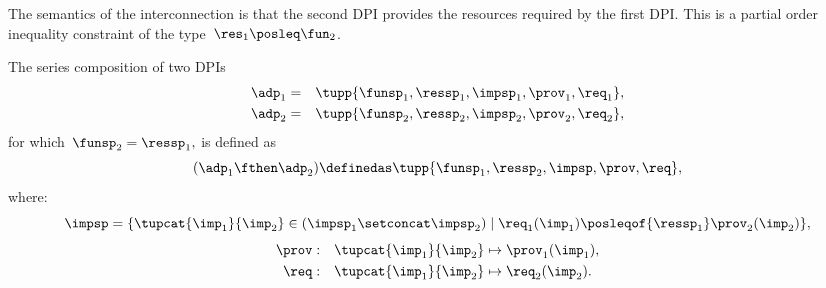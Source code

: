\begin{figure}[h]
	\centering
	\caption{}
	\label{fig:connection}
\end{figure}


The semantics of the interconnection is that the second DPI provides the resources required by the first DPI.
This is a partial order inequality constraint of the type~$\res_{1}\posleq\fun_{2}$.

\begin{definition}
	\label{def:series-composition}
	The series composition of two DPIs
	\begin{equation}
		\begin{aligned}
			\adp_{1} & = & \tupp{\funsp_{1},\ressp_{1},\impsp_{1},\prov_{1},\req_{1}}, \\
			\adp_{2} & = & \tupp{\funsp_{2},\ressp_{2},\impsp_{2},\prov_{2},\req_{2}},
		\end{aligned}
	\end{equation}
	for which~$\funsp_{2}=\ressp_{1},$ is defined as
	\begin{equation}
		(\adp_{1} \fthen \adp_{2})
		\definedas
		\tupp{ \funsp_{1},\ressp_{2},\impsp,\prov,\req},
	\end{equation}
	where:
	\begin{equation}
		\impsp  =  \{  \tupcat {\imp_{1}} {\imp_{2}} \in (\impsp_{1} \setconcat \impsp_{2})\mid\req_{1}(\imp_{1})\posleqof{\ressp_{1}}\prov_{2}(\imp_{2})\},
	\end{equation}
	\begin{equation}
		\begin{aligned}
			\prov & : & \tupcat {\imp_{1}} {\imp_{2}} & \mapsto\prov_{1}(\imp_{1}), \\
			\req  & : & \tupcat {\imp_{1}} {\imp_{2}} & \mapsto\req_{2}(\imp_{2}).
		\end{aligned}
	\end{equation}
\end{definition}

\begin{marginfigure}
	\label{fig:composition-2}
	\begin{center}
	\end{center}
\end{marginfigure}

